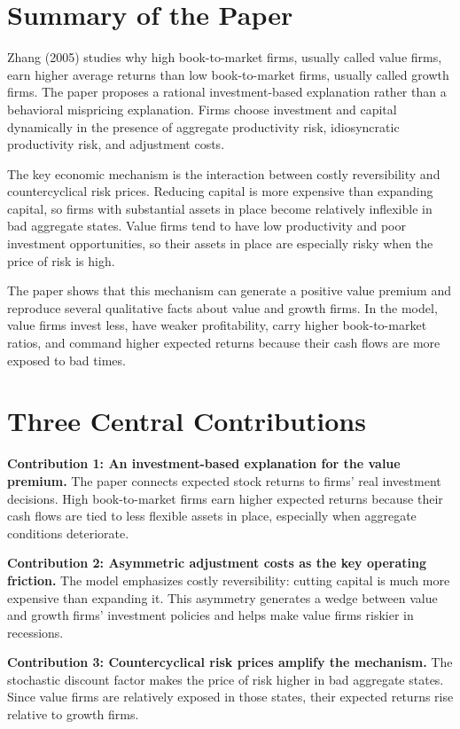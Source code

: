 \documentclass[11pt]{article}
\begin{document}
\section{Summary of the Paper}

Zhang (2005) studies why high book-to-market firms, usually called value firms, earn higher average returns than low book-to-market firms, usually called growth firms. The paper proposes a rational investment-based explanation rather than a behavioral mispricing explanation. Firms choose investment and capital dynamically in the presence of aggregate productivity risk, idiosyncratic productivity risk, and adjustment costs.

The key economic mechanism is the interaction between costly reversibility and countercyclical risk prices. Reducing capital is more expensive than expanding capital, so firms with substantial assets in place become relatively inflexible in bad aggregate states. Value firms tend to have low productivity and poor investment opportunities, so their assets in place are especially risky when the price of risk is high.

The paper shows that this mechanism can generate a positive value premium and reproduce several qualitative facts about value and growth firms. In the model, value firms invest less, have weaker profitability, carry higher book-to-market ratios, and command higher expected returns because their cash flows are more exposed to bad times.

\section{Three Central Contributions}

\textbf{Contribution 1: An investment-based explanation for the value premium.}
The paper connects expected stock returns to firms' real investment decisions. High book-to-market firms earn higher expected returns because their cash flows are tied to less flexible assets in place, especially when aggregate conditions deteriorate.

\textbf{Contribution 2: Asymmetric adjustment costs as the key operating friction.}
The model emphasizes costly reversibility: cutting capital is much more expensive than expanding it. This asymmetry generates a wedge between value and growth firms' investment policies and helps make value firms riskier in recessions.

\textbf{Contribution 3: Countercyclical risk prices amplify the mechanism.}
The stochastic discount factor makes the price of risk higher in bad aggregate states. Since value firms are relatively exposed in those states, their expected returns rise relative to growth firms.
\end{document}
